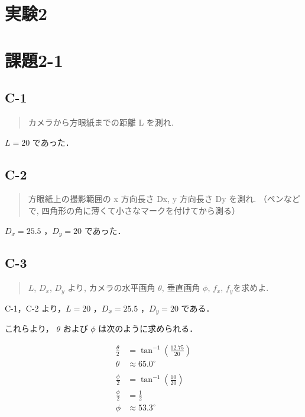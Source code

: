 \documentclass[fleqn, a4paper. 12pt]{jsarticle}
\begin{document}
      

  \newpage

  \section*{実験2}

  \section*{課題2-1}

    \subsection*{C-1}

      \begin{quote}
        カメラから方眼紙までの距離 L を測れ.
      \end{quote}

      $L = 20$ であった．
      
    \subsection*{C-2}

      \begin{quote}
        方眼紙上の撮影範囲の x 方向長さ Dx, y 方向長さ Dy を測れ. （ペンなどで, 四角形の角に薄くて小さなマークを付けてから測る）
      \end{quote}

      $D_x = 25.5$ ，$D_y = 20$ であった．

    \subsection*{C-3}

      \begin{quote}
        \( L \), \( D_x \), \( D_y \) より, カメラの水平画角 \( \theta \), 垂直画角 \( \phi \), \( f_x \), \( f_y \)を求めよ.
      \end{quote}

      C-1，C-2 より，$ L = 20$ ，$D_x = 25.5$ ，$D_y = 20$ である．

      これらより， $\theta$ および $\phi$ は次のように求められる．

      \begin{align*}
        \frac{\theta}{2} &= \tan^{-1} \left( \frac{12.75}{20} \right) \\
        \theta &\approx 65.0^\circ \\
        \\
        \frac{\phi}{2} &= \tan^{-1} \left( \frac{10}{20} \right) \\
        \frac{\phi}{2} &= \frac{1}{2} \\
        \phi &\approx 53.3^\circ
      \end{align*}
\end{document}
